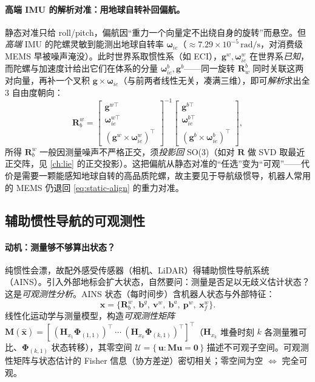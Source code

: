 \paragraph{高端 IMU 的解析对准：用地球自转补回偏航。}
静态对准只给 roll/pitch，偏航因“重力一个向量定不出绕自身的旋转”而悬空。但\emph{高端} IMU 的陀螺灵敏到能测出地球自转率 $\boldsymbol\omega_{ie}$（$\approx7.29\times10^{-5}\,\mathrm{rad/s}$，对消费级 MEMS 早被噪声淹没）。此时世界系取惯性系（如 ECI），$\mathbf g^w,\boldsymbol\omega_{ie}^w$ 在世界系\emph{已知}，而陀螺与加速度计给出它们在体系的分量 $\boldsymbol\omega_{ie}^b,\mathbf g^b$——同一旋转 $\mathbf R_w^b$ 同时关联这两对向量，再补一个叉积 $\mathbf g\times\boldsymbol\omega_{ie}$（与前两者线性无关，凑满三维），即可\emph{解析}求出全 $3$ 自由度朝向\cite{carlone2026handbook}：
\begin{equation}
  \mathbf R_b^w=
  \begin{bmatrix}\mathbf g^{w\top}\\ \boldsymbol\omega_{ie}^{w\top}\\ (\mathbf g^w\times\boldsymbol\omega_{ie}^w)^\top\end{bmatrix}^{-1}
  \begin{bmatrix}\mathbf g^{b\top}\\ \boldsymbol\omega_{ie}^{b\top}\\ (\mathbf g^b\times\boldsymbol\omega_{ie}^b)^\top\end{bmatrix},
  \label{eq:analytic-align}
\end{equation}
所得 $\mathbf R_b^w$ 一般因测量噪声不严格正交，须\emph{投影回} SO(3)（如对 $\mathbf R$ 做 SVD 取最近正交阵，见 \cref{ch:lie} 的正交投影）。这把偏航从静态对准的“任选”变为“可观”——代价是需要一颗能感知地球自转的高品质陀螺，故主要见于导航级惯导，机器人常用的 MEMS 仍退回 \cref{eq:static-align} 的重力对准。

\subsection{辅助惯性导航的可观测性}
\label{subsec:aided-obs}

\paragraph{动机：测量够不够算出状态？}
纯惯性会漂，故配外感受传感器（相机、LiDAR）得辅助惯性导航系统（AINS）。引入外部地标会扩大状态，自然要问：测量是否足以无歧义估计状态？这是\emph{可观测性分析}\cite{carlone2026handbook}。AINS 状态（每时间步）含机器人状态与外部特征：
\begin{equation}
  \boldsymbol x=\{\mathbf R_b^w,\ \mathbf b^g,\ \mathbf v^w,\ \mathbf b^a,\ \mathbf p^w,\ \boldsymbol x_f^w\}.
  \label{eq:ains-state}
\end{equation}
线性化运动学与测量模型，构造\emph{可观测性矩阵} $\mathbf M(\hat{\boldsymbol x})=[\,(\mathbf H_{x_1}\boldsymbol\Phi_{(1,1)})^\top\ \cdots\ (\mathbf H_{x_k}\boldsymbol\Phi_{(k,1)})^\top]^\top$（$\mathbf H_{x_k}$ 堆叠时刻 $k$ 各测量雅可比、$\boldsymbol\Phi_{(k,1)}$ 状态转移），其零空间 $\mathcal U=\{\,\boldsymbol u:\mathbf M\boldsymbol u=\mathbf 0\,\}$ 描述不可观子空间。可观测性矩阵与状态估计的 Fisher 信息（协方差逆）密切相关；零空间为空 $\iff$ 完全可观。

